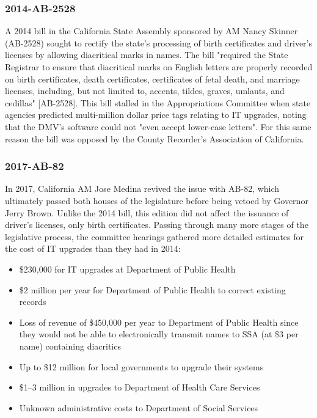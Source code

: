 \subsubsection{2014-AB-2528}

A 2014 bill in the California State Assembly sponsored by AM Nancy Skinner
(AB-2528) sought to rectify the state's processing of birth certificates and
driver's licenses by allowing diacritical marks in names. The bill "required the
State Registrar to ensure that diacritical marks on English letters are properly
recorded on birth certificates, death certificates, certificates of fetal death,
and marriage licenses, including, but not limited to, accents, tildes, graves,
umlauts, and cedillas" {[}AB-2528{]}. This bill stalled in the Appropriations
Committee when state agencies predicted multi-million dollar price tags relating
to IT upgrades, noting that the DMV's software could not "even accept lower-case
letters". For this same reason the bill was opposed by the County Recorder's
Association of California.

\subsubsection{2017-AB-82}

In 2017, California AM Jose Medina revived the issue with AB-82, which
ultimately passed both houses of the legislature before being vetoed by
Governor Jerry Brown. Unlike the 2014 bill, this edition did not affect
the issuance of driver's licenses, only birth certificates. Passing
through many more stages of the legislative process, the committee
hearings gathered more detailed estimates for the cost of IT upgrades
than they had in 2014:

\begin{itemize}
\item
  \$230,000 for IT upgrades at Department of Public Health
\item
  \$2 million per year for Department of Public Health to correct
  existing records
\item
  Loss of revenue of \$450,000 per year to Department of Public Health
  since they would not be able to electronically transmit names to SSA
  (at \$3 per name) containing diacritics
\item
  Up to \$12 million for local governments to upgrade their systems
\item
  \$1--3 million in upgrades to Department of Health Care Services
\item
  Unknown administrative costs to Department of Social Services
\end{itemize}

